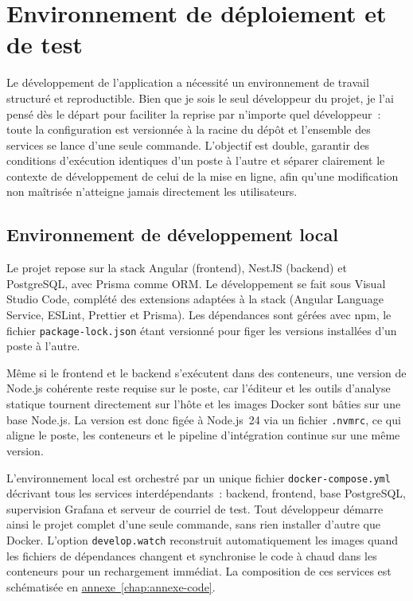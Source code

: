 
\section{Environnement de déploiement et de test}

Le développement de l'application a nécessité un environnement de travail structuré et reproductible. Bien que je sois le seul développeur du projet, je l'ai pensé dès le départ pour faciliter la reprise par n'importe quel développeur~: toute la configuration est versionnée à la racine du dépôt et l'ensemble des services se lance d'une seule commande. L'objectif est double, garantir des conditions d'exécution identiques d'un poste à l'autre et séparer clairement le contexte de développement de celui de la mise en ligne, afin qu'une modification non maîtrisée n'atteigne jamais directement les utilisateurs.

\subsection{Environnement de développement local}\label{subsec:env-local}
Le projet repose sur la stack Angular (frontend), NestJS (backend) et PostgreSQL, avec Prisma comme ORM. Le développement se fait sous Visual Studio Code, complété des extensions adaptées à la stack (Angular Language Service, ESLint, Prettier et Prisma). Les dépendances sont gérées avec npm, le fichier \texttt{package-lock.json} étant versionné pour figer les versions installées d'un poste à l'autre.

Même si le frontend et le backend s'exécutent dans des conteneurs, une version de Node.js cohérente reste requise sur le poste, car l'éditeur et les outils d'analyse statique tournent directement sur l'hôte et les images Docker sont bâties sur une base Node.js. La version est donc figée à Node.js~24 via un fichier \texttt{.nvmrc}, ce qui aligne le poste, les conteneurs et le pipeline d'intégration continue sur une même version.

L'environnement local est orchestré par un unique fichier \texttt{docker-compose.yml} décrivant tous les services interdépendants~: backend, frontend, base PostgreSQL, supervision Grafana et serveur de courriel de test. Tout développeur démarre ainsi le projet complet d'une seule commande, sans rien installer d'autre que Docker. L'option \texttt{develop.watch} reconstruit automatiquement les images quand les fichiers de dépendances changent et synchronise le code à chaud dans les conteneurs pour un rechargement immédiat. La composition de ces services est schématisée en \hyperref[ann:docker-local]{annexe~\ref*{chap:annexe-code}}.

